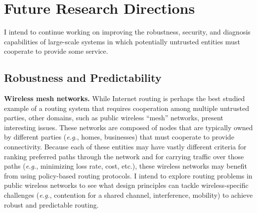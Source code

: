 \documentclass[11pt]{article}
\newcommand{\eg}{{\em e.g.}}
\begin{document}



\section*{Future Research Directions}

I intend to continue working on improving the robustness, security,
and diagnosis capabilities of large-scale systems in which potentially
untrusted entities must cooperate to provide some service.  

\subsection*{Robustness and Predictability}
\parindent=0pt
\parskip=6pt


{\bf Wireless mesh networks.}  While Internet routing is perhaps the
best studied example of a routing system that requires cooperation among
multiple untrusted parties, other domains, such as public wireless
``mesh'' networks, present interesting issues.  These networks are
composed of nodes that are typically owned by different parties (\eg,
homes, businesses) that must cooperate to provide connectivity.  Because
each of these entities may have vastly different criteria for ranking
preferred paths through the network and for carrying traffic over those
paths (\eg, minimizing loss rate, cost, etc.), these wireless networks
may benefit from using policy-based routing protocols.  I intend to
explore routing problems in public wireless networks to see what design
principles can tackle wireless-specific challenges (\eg, contention for
a shared channel, interference, mobility) to achieve robust and
predictable routing.
\end{document}
